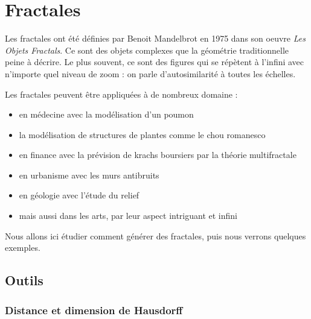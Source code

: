 \chapter{Fractales}
\label{ch-2}


	Les fractales ont été définies par Benoit Mandelbrot en 1975 dans son oeuvre \emph{Les Objets Fractals}.
	Ce sont des objets complexes que la géométrie traditionnelle peine à décrire. Le plus souvent, ce sont des figures qui se répètent à l'infini avec n'importe quel niveau de zoom : on parle d'autosimilarité à toutes les échelles.

	Les fractales peuvent être appliquées à de nombreux domaine :
	\begin{itemize}
		\item en médecine avec la modélisation d'un poumon
		\item la modélisation de structures de plantes comme le chou romanesco
		\item en finance avec la prévision de krachs boursiers par la théorie multifractale
		\item en urbanisme avec les murs antibruits
		\item en géologie avec l'étude du relief
		\item mais aussi dans les arts, par leur aspect intriguant et infini
	\end{itemize}

	Nous allons ici étudier comment générer des fractales, puis nous verrons quelques exemples.

\section{Outils}

	\subsection{Distance et dimension de Hausdorff}

